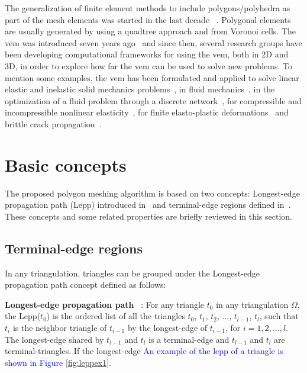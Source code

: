 The generalization of finite element methods to include polygons/polyhedra as part of the mesh elements was started in the last decade ~\cite{Sukumar2006,tabarraei2008extended,NATARAJAN2017218}.  Polygonal elements are usually generated by using a quadtree approach and from Voronoi cells. The {\sc vem} was introduced seven years  ago~\cite{Basisprinciples,Brezzi2015} and since then, several research groups have been developing computational frameworks  for using the {\sc vem}, both in 2D and 3D, in order to explore how far the {\sc vem} can be used to solve new problems. To mention some  examples, the {\sc vem} has been formulated and applied to solve linear elastic and inelastic solid mechanics problems~\cite{da2015virtual}, in fluid mechanics~\cite{caceres2015mixed}, in the optimization
of  a fluid problem through a discrete network~\cite{benedetto2014virtual}, for compressible and incompressible nonlinear elasticity~\cite{Wriggers2017}, for finite elasto-plastic deformations~\cite{Wriggers2017a} and brittle crack propagation~\cite{HUSSEIN201915}.


\section{Basic concepts}
\label{sec:basic}


The proposed polygon meshing algorithm is based on two concepts: Longest-edge propagation path (Lepp) introduced in~\cite{Rivara97} and terminal-edge regions defined in~\cite{Ascom209}. These concepts and some related properties are briefly reviewed in this section.

\subsection{Terminal-edge regions}

In any triangulation, triangles can be grouped under the Longest-edge propagation path concept defined as follows:



\begin{definition}{\textbf{Longest-edge propagation path }~\cite{Rivara97}:}\label{d:lepp}  
For any triangle $t_0$ in any triangulation $\Omega$, the Lepp($t_0$)
is the ordered list of all the triangles $t_0$, $t_1$, $t_2$, ..., $t_{l-1}$, $t_{l}$, such that $t_{i}$ is the neighbor triangle of $t_{i-1}$  by the longest-edge of $t_{i-1}$, for $i = 1,2,\dots,l$. The longest-edge shared by $t_{l-1}$ and $t_l$ is a terminal-edge and $t_{l-1}$ and  $t_l$ are terminal-triangles. If the longest-edge   \textcolor{blue}{An example of the lepp of a triangle is shown in Figure \ref{fig:leppex1}.}
\end{definition}



